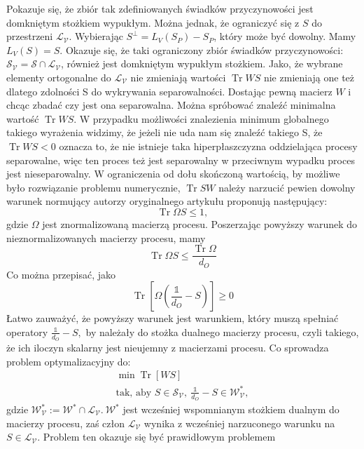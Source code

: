 \documentclass[10pt]{article} %
\DeclareMathOperator{\Trs}{Tr}
\newcommand{\I}{\mathbb{1}}
\begin{document}
Pokazuje się, że zbiór tak zdefiniowanych świadków przyczynowości jest domkniętym stożkiem wypukłym. Można jednak, że ograniczyć się z $S$ do przestrzeni 
$\mathcal{L_V}$. Wybierając $S^\bot = L_V(S_P) - S_P$, który może być dowolny. Mamy $L_V(S) = S$. Okazuje się, że taki ograniczony zbiór świadków przyczynowości: $\mathcal{S_V} = \mathcal{S} \cap \mathcal{L_V}$, również jest domkniętym wypukłym stożkiem. Jako, że wybrane elementy ortogonalne do
$\mathcal{L_V}$ nie zmieniają wartości $\Trs WS$ nie zmieniają one też dlatego zdolności S do wykrywania separowalności. 
Dostając pewną macierz $W$ i chcąc zbadać czy jest ona separowalna. Można spróbować znaleźć minimalna wartość $\Trs WS$. W przypadku możliwości 
znalezienia minimum globalnego takiego wyrażenia widzimy, że jeżeli nie uda nam się znaleźć takiego S, że $\Trs WS < 0$ oznacza to, że nie istnieje
taka hiperpłaszczyzna oddzielająca procesy separowalne, więc ten proces też jest separowalny w przeciwnym wypadku proces jest nieseparowalny.
W ograniczenia od dołu skończoną wartością, by możliwe było rozwiązanie problemu numerycznie, $\Trs SW$ należy narzucić pewien dowolny warunek normujący
autorzy oryginalnego artykułu proponują następujący:
\begin{equation}
\Trs \Omega S \leq 1,
\end{equation}
gdzie $\Omega$ jest znormalizowaną macierzą procesu.
Poszerzając powyższy warunek do nieznormalizowanych macierzy procesu, mamy
\begin{equation}
\Trs \Omega S \leq \frac{\Trs \Omega}{d_O}
\end{equation}
Co można przepisać, jako 
\begin{equation}
\Trs \left[ \Omega(\frac{\I}{d_O} -S) \right] \geq 0
\end{equation}
Łatwo zauważyć, że powyższy warunek jest warunkiem, który muszą spełniać operatory $\frac{\I}{d_O} - S,$ by należały do stożka dualnego macierzy procesu, czyli takiego, że ich iloczyn skalarny jest nieujemny z macierzami procesu. Co sprowadza problem optymalizacyjny do:
\begin{gather}
\min \Trs \left[ WS \right]\\
\text{tak, aby } S \in \mathcal{S_V},~ \frac{\I}{d_O} - S \in \mathcal{W^*_V},
\end{gather}
gdzie $\mathcal{W^*_V}:=\mathcal{W^*} \cap \mathcal{L_V}.~ \mathcal{W^*}$ jest wcześniej wspomnianym stożkiem dualnym do macierzy procesu,
zaś człon $\mathcal{L_V}$ wynika z wcześniej narzuconego warunku na $S \in \mathcal{L_V}$. Problem ten okazuje się być prawidłowym problemem
\end{document}
